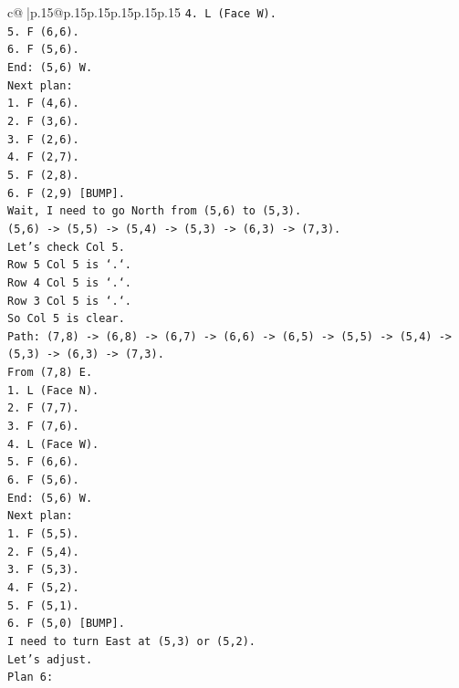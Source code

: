 \documentclass{article}
\begin{document}
{\begin{supertabular}{c@{$\;$}|p{.15\linewidth}@{}p{.15\linewidth}p{.15\linewidth}p{.15\linewidth}p{.15\linewidth}p{.15\linewidth}}
{{{\texttt{4. L (Face W).} \\
\texttt{5. F (6,6).} \\
\texttt{6. F (5,6).} \\
\texttt{End: (5,6) W.} \\
\texttt{Next plan:} \\
\texttt{1. F (4,6).} \\
\texttt{2. F (3,6).} \\
\texttt{3. F (2,6).} \\
\texttt{4. F (2,7).} \\
\texttt{5. F (2,8).} \\
\texttt{6. F (2,9) {[}BUMP{]}.} \\
\texttt{Wait, I need to go North from (5,6) to (5,3).} \\
\texttt{(5,6) {-}> (5,5) {-}> (5,4) {-}> (5,3) {-}> (6,3) {-}> (7,3).} \\
\texttt{Let's check Col 5.} \\
\texttt{Row 5 Col 5 is `.`.} \\
\texttt{Row 4 Col 5 is `.`.} \\
\texttt{Row 3 Col 5 is `.`.} \\
\texttt{So Col 5 is clear.} \\
\texttt{Path: (7,8) {-}> (6,8) {-}> (6,7) {-}> (6,6) {-}> (6,5) {-}> (5,5) {-}> (5,4) {-}> (5,3) {-}> (6,3) {-}> (7,3).} \\
\texttt{From (7,8) E.} \\
\texttt{1. L (Face N).} \\
\texttt{2. F (7,7).} \\
\texttt{3. F (7,6).} \\
\texttt{4. L (Face W).} \\
\texttt{5. F (6,6).} \\
\texttt{6. F (5,6).} \\
\texttt{End: (5,6) W.} \\
\texttt{Next plan:} \\
\texttt{1. F (5,5).} \\
\texttt{2. F (5,4).} \\
\texttt{3. F (5,3).} \\
\texttt{4. F (5,2).} \\
\texttt{5. F (5,1).} \\
\texttt{6. F (5,0) {[}BUMP{]}.} \\
\texttt{I need to turn East at (5,3) or (5,2).} \\
\texttt{Let's adjust.} \\
\texttt{Plan 6:} \\
}}}
\end{supertabular}}
\end{document}
